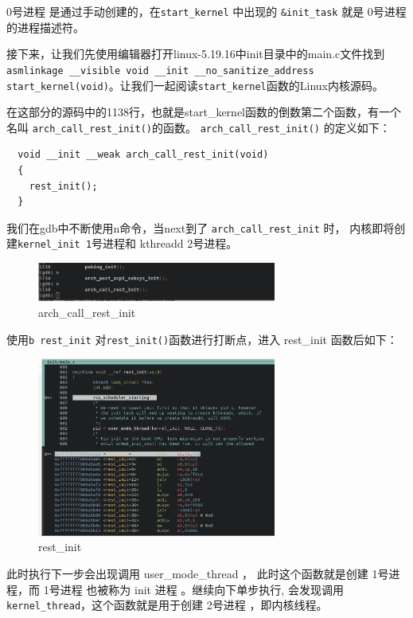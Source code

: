 \documentclass[lang=cn,10pt]{elegantbook}
\begin{document}
\newpage
0号进程 是通过手动创建的，在\lstinline{start_kernel} 中出现的 \lstinline{&init_task} 就是 0号进程 的进程描述符。

接下来，让我们先使用编辑器打开linux-5.19.16中init目录中的main.c文件找到\lstinline{asmlinkage __visible void __init __no_sanitize_address start_kernel(void)}。让我们一起阅读\lstinline{start_kernel}函数的Linux内核源码。

在这部分的源码中的1138行，也就是start\_kernel函数的倒数第二个函数，有一个名叫 \lstinline{arch_call_rest_init()}的函数。 \lstinline{arch_call_rest_init()} 的定义如下：

\begin{lstlisting}
  void __init __weak arch_call_rest_init(void)
  {
    rest_init();
  }
\end{lstlisting}

我们在gdb中不断使用n命令，当next到了 \lstinline{arch_call_rest_init} 时， 内核即将创建\lstinline{kernel_init 1}号进程和 kthreadd 2号进程。
\begin{figure}[htbp]
  \centering
  \includegraphics[width=0.7\textwidth]{image/image-20231105113449231.png}
  \caption{arch\_call\_rest\_init}
\end{figure}

\newpage
使用\lstinline{b rest_init} 对\lstinline{rest_init()}函数进行打断点，进入 rest\_init 函数后如下：
\begin{figure}[htbp]
  \centering
  \includegraphics[width=0.7\textwidth]{image/image-20231111155131309.png}
  \caption{rest\_init}
\end{figure}


此时执行下一步会出现调用 user\_mode\_thread ， 此时这个函数就是创建 1号进程，而 1号进程 也被称为 init 进程 。继续向下单步执行, 会发现调用 \lstinline{kernel_thread}，这个函数就是用于创建 2号进程 ，即内核线程。
\end{document}
